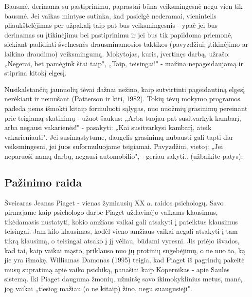 \documentclass{article}
\begin{document}
Bausmė, derinama su pastiprinimu, paprastai būna veiksmingesnė negu vien tik bausmė. Jei vaikas mintyse sutinka, kad pasielgė nederamai, vienintelis pliaukštelėjimas per užpakalį taip pat bus veiksmingesnis - ypač jei bus derinamas su įtikinėjimu bei pastiprinimu ir jei bus tik papildoma priemonė, siekiant padidinti švelnesnės drausminamosios taktikos (pavyzdžiui, įtikinėjimo ar laikino draudimo) veiksmingumą. Mokytojas, kuris, įvertinęs darbą, užrašo: „Negerai, bet pamėgink štai taip", „Taip, teisingai!" - mažina nepageidaujamą ir stiprina kitokį elgesį.

Nusikalstančių jaunuolių tėvai dažnai nežino, kaip sutvirtinti pageidautiną elgesį nerėkiant ir nemušant (Patterson ir kiti, 1982). Tokių tėvų mokymo programos padeda jiems išmokti kitaip formuluoti sąlygas, nuo nuožmių grasinimų pereinant prie teigiamų skatinimų - užuot šaukus: „Arba tuojau pat susitvarkyk kambarį, arba negausi vakarienės!" - pasakyti: „Kai susitvarkysi kambarį, ateik vakarieniauti". Jei susimąstytume, daugelis grasinimų nubausti gali tapti dar veiksmingesni, jei juos suformuluojame teigiamai. Pavyzdžiui, vietoj: „Jei neparuoši namų darbų, negausi automobilio", - geriau sakyti.. (užbaikite patys).

\subsection{Pažinimo raida}\hypertarget{pazinimoraida}{}
Šveicaras Jeanas Piaget - vienas žymiausių XX a. raidos psichologų. Savo pirmajame kaip psichologo darbe Piaget uždavinėjo vaikams klausimus, tikėdamasis nustatyti, kokio amžiaus vaikai gali atsakyti į pateiktus klausimus teisingai. Jam kilo klausimas, kodėl vieno amžiaus vaikai negali atsakyti į tam tikrą klausimą, o teisingai atsako į jį vėliau, būdami vyresni. Jis priėjo išvados, kad tai, kaip vaikai mąsto, priklauso nuo jų protinių sugebėjimų, o ne nuo to, ką jie yra išmokę. Williamas Damonas (1995) teigia,
kad Piaget iš pagrindų pakeitė mūsų supratimą apie vaiko psichiką, panašiai kaip Kopernikas - apie Saulės sistemą. Iki Piaget dauguma žmonių, užmiršę savo ikimokyklinius metus, manė, jog vaikai „tiesiog mažiau (o ne kitaip) žino, negu suaugusieji". 
\end{document}
